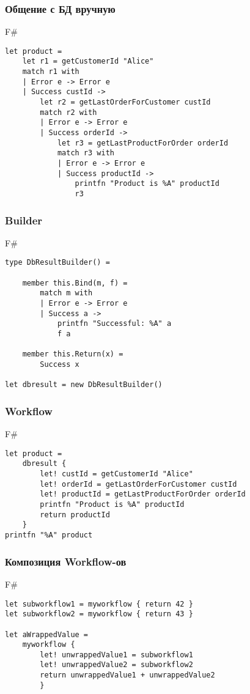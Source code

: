 \documentclass[xetex,mathserif,serif]{beamer}
\begin{document}
	\begin{frame}[fragile]
		\frametitle{Общение с БД вручную}
		\begin{exampleblock}{F\#}
			\begin{verbatim}
let product = 
    let r1 = getCustomerId "Alice"
    match r1 with 
    | Error e -> Error e
    | Success custId ->
        let r2 = getLastOrderForCustomer custId 
        match r2 with 
        | Error e -> Error e
        | Success orderId ->
            let r3 = getLastProductForOrder orderId 
            match r3 with 
            | Error e -> Error e
            | Success productId ->
                printfn "Product is %A" productId
                r3
			\end{verbatim}
		\end{exampleblock}
\end{frame}

	\begin{frame}[fragile]
		\frametitle{Builder}
		\begin{exampleblock}{F\#}
			\begin{verbatim}
type DbResultBuilder() =

    member this.Bind(m, f) = 
        match m with
        | Error e -> Error e
        | Success a -> 
            printfn "Successful: %A" a
            f a

    member this.Return(x) = 
        Success x

let dbresult = new DbResultBuilder()
			\end{verbatim}
		\end{exampleblock}
\end{frame}

	\begin{frame}[fragile]
		\frametitle{Workflow}
		\begin{exampleblock}{F\#}
			\begin{verbatim}
let product = 
    dbresult {
        let! custId = getCustomerId "Alice"
        let! orderId = getLastOrderForCustomer custId
        let! productId = getLastProductForOrder orderId 
        printfn "Product is %A" productId
        return productId
    }
printfn "%A" product
			\end{verbatim}
		\end{exampleblock}
\end{frame}

	\begin{frame}[fragile]
		\frametitle{Композиция Workflow-ов}
		\begin{exampleblock}{F\#}
			\begin{verbatim}
let subworkflow1 = myworkflow { return 42 }
let subworkflow2 = myworkflow { return 43 }

let aWrappedValue = 
    myworkflow {
        let! unwrappedValue1 = subworkflow1
        let! unwrappedValue2 = subworkflow2
        return unwrappedValue1 + unwrappedValue2
        }
			\end{verbatim}
		\end{exampleblock}
\end{frame}
\end{document}
